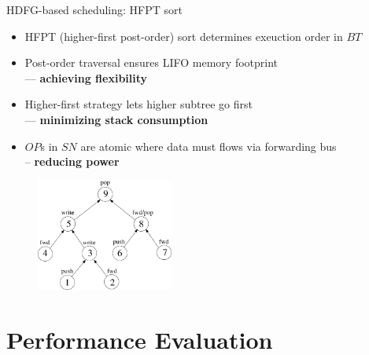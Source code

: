 \documentclass{beamer}
\begin{document}
\begin{CJK}{UTF8}{bkai}
    \begin{frame}{HDFG-based scheduling: HFPT sort}
        \begin{itemize}
            \item HFPT (higher-first post-order) sort determines exeuction order in $BT$
            \item Post-order traversal ensures LIFO memory footprint \\ --- \textbf{achieving flexibility}
            \item Higher-first strategy lets higher subtree go first \\ --- \textbf{minimizing stack consumption}
            \item $OP$s in $SN$ are atomic where data must flows via forwarding bus \\ -- \textbf{reducing power}
        \end{itemize}
        \begin{figure}[!h]
            \begin{center}
                \includegraphics[width=0.4\textwidth]{figs/hfpt.eps}
            \end{center}
            \label{fig:hfpt}
        \end{figure}%
    \end{frame}

    \section{Performance Evaluation}

\end{CJK}
\end{document}
